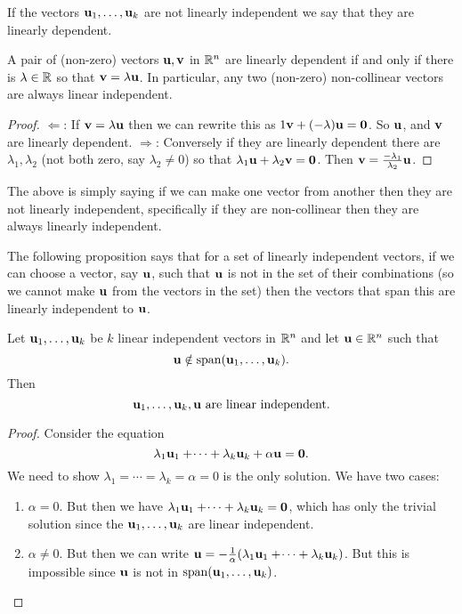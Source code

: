 \documentclass[10pt, a4paper]{article}
\begin{document}
If the vectors $\mathbf{u}_1, \dotsc, \mathbf{u}_k$ are not linearly independent we say that they are linearly dependent.

\begin{lemma}
    A pair of (non-zero) vectors $\mathbf{u}, \mathbf{v}$ in $\mathbb{R} ^ n$ are linearly dependent if and only if there is $\lambda \in \mathbb{R}$ so that $\mathbf{v} = \lambda\mathbf{u}$.
    In particular,
    any two (non-zero) non-collinear vectors are always linear independent.
    \begin{proof}
        $\Leftarrow$:
        If $\mathbf{v} = \lambda\mathbf{u}$ then we can rewrite this as $1\mathbf{v} + (-\lambda)\mathbf{u} = \mathbf{0}$.
        So $\mathbf{u}$,
        and $\mathbf{v}$ are linearly dependent.
        $\Rightarrow$:
        Conversely if they are linearly dependent there are $\lambda_1, \lambda_2$ (not both zero, say $\lambda_2 \neq 0$) so that $\lambda_1\mathbf{u} + \lambda_2\mathbf{v} = \mathbf{0}$.
        Then
        $\mathbf{v} = \frac{-\lambda_1}{\lambda_2}\mathbf{u}$.
    \end{proof}
\end{lemma}
The above is simply saying if we can make one vector from another then they are not linearly independent,
specifically if they are non-collinear then they are always linearly independent.

The following proposition says that for a set of linearly independent vectors,
if we can choose a vector,
say $\mathbf{u}$,
such that $\mathbf{u}$ is not in the set of their combinations
(so we cannot make $\mathbf{u}$ from the vectors in the set)
then the vectors that span this are linearly independent to $\mathbf{u}$.

\begin{proposition}
    Let $\mathbf{u}_1, \dotsc, \mathbf{u}_k$ be $k$ linear independent vectors in $\mathbb{R} ^ n$ and let $\mathbf{u} \in \mathbb{R} ^ n$ such that
    \[
    \mathbf{u} \notin \mathrm{span}(\mathbf{u}_1, \dotsc, \mathbf{u}_k).
    \]
    Then
    \[
    \mathbf{u}_1, \dotsc, \mathbf{u}_k, \mathbf{u}\text{ are linear independent}.
    \]
    \begin{proof}
        Consider the equation
        \[
        \lambda_1\mathbf{u}_1 + \dotsi + \lambda_k\mathbf{u}_k + \alpha\mathbf{u} = \mathbf{0}.
        \]
        We need to show $\lambda_1 = \dotsi = \lambda_k = \alpha = 0$ is the only solution.
        We have two cases:
        \begin{enumerate}[label = \arabic*)]
            \item $\alpha = 0$.
            But then we have $\lambda_1\mathbf{u}_1 + \dotsi + \lambda_k\mathbf{u}_k = \mathbf{0}$,
            which has only the trivial solution since the $\mathbf{u}_1, \dotsc, \mathbf{u}_k$ are linear independent.
            \item $\alpha \neq 0$.
            But then we can write $\mathbf{u} = -\frac{1}{\alpha}(\lambda_1\mathbf{u}_1 + \dotsi + \lambda_k\mathbf{u}_k)$.
            But this is impossible since $\mathbf{u}$ is not in $\mathrm{span}(\mathbf{u}_1, \dotsc, \mathbf{u}_k)$.
        \end{enumerate}
    \end{proof}
\end{proposition}
\end{document}
